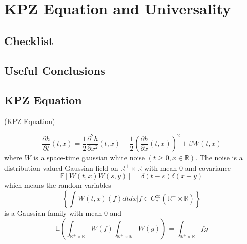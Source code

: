 \section{KPZ Equation and Universality}

\subsection{Checklist}

\subsection{Useful Conclusions}

\subsection{KPZ Equation}

\begin{definition}
    (KPZ Equation)\par
    \[
    \dfrac{\partial h}{\partial t}(t,x) = \dfrac{1}{2}\dfrac{\partial^2 h}{\partial x^2}(t,x) + \dfrac{1}{2}\left(\dfrac{\partial h}{\partial x}(t,x)\right)^2 + \beta W(t,x)
    \]
    where $W$ is a space-time gaussian white noise $(t\geq 0, x\in\mathbb{R})$. The noise is a distribution-valued Gaussian field on $\mathbb{R}^+\times\mathbb{R}$ with mean $0$ and covariance
    \[
    \mathbb{E}[W(t,x)W(s,y)] = \delta(t-s)\delta(x-y)
    \]
    which means the random variables
    \[
    \left\{\int W(t,x)(f)dtdx|f \in C^{\infty}_c(\mathbb{R}^+\times\mathbb{R})\right\}
    \]
    is a Gaussian family with mean $0$ and
    \[
    \mathbb{E} \left(\int_{\mathbb{R}^+\times\mathbb{R}} W(f)\int_{\mathbb{R}^+\times\mathbb{R}} W(g)\right) = \int_{\mathbb{R}^+\times\mathbb{R}} fg
    \]
\end{definition}